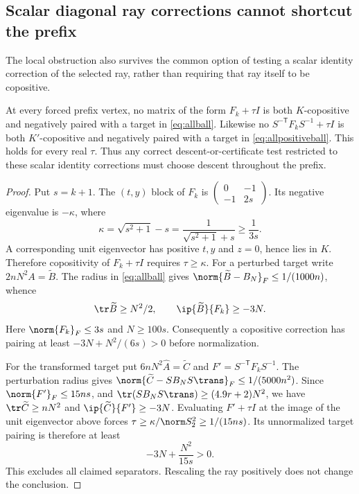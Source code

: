 \subsection{Scalar diagonal ray corrections cannot shortcut the prefix}
The local obstruction also survives the common option of testing a scalar identity correction of the selected ray, rather than requiring that ray itself to be copositive.
\begin{corollary}\label{cor:raycorrection}
At every forced prefix vertex, no matrix of the form $F_k+\tau I$ is both $K$-copositive and negatively paired with a target in \eqref{eq:allball}. Likewise no $S^{-\mathsf T}F_kS^{-1}+\tau I$ is both $K'$-copositive and negatively paired with a target in \eqref{eq:allpositiveball}. This holds for every real $\tau$. Thus any correct descent-or-certificate test restricted to these scalar identity corrections must choose descent throughout the prefix.
\end{corollary}
\begin{proof}
Put $s=k+1$. The $(t,y)$ block of $F_k$ is $\left(\begin{smallmatrix}0&-1\\-1&2s\end{smallmatrix}\right)$. Its negative eigenvalue is $-\kappa$, where
\[
 \kappa=\sqrt{s^2+1}-s=\frac1{\sqrt{s^2+1}+s}\ge\frac1{3s}.
\]
A corresponding unit eigenvector has positive $t,y$ and $z=0$, hence lies in $K$. Therefore copositivity of $F_k+\tau I$ requires $\tau\ge\kappa$. For a perturbed target write $2nN^2A=\widetilde B$. The radius in \eqref{eq:allball} gives $\norm{\widetilde B-B_N}_F\le1/(1000n)$, whence
\[
 \tr\widetilde B\ge N^2/2,\qquad
 \ip{\widetilde B}{F_k}\ge-3N.
\]
Here $\norm{F_k}_F\le3s$ and $N\ge100s$. Consequently a copositive correction has pairing at least $-3N+N^2/(6s)>0$ before normalization.

For the transformed target put $6nN^2\widehat A=\widetilde C$ and $F'=S^{-\mathsf T}F_kS^{-1}$. The perturbation radius gives $\norm{\widetilde C-SB_NS\trans}_F\le1/(5000n^2)$. Since $\norm{F'}_F\le15ns$, and $\tr(SB_NS\trans)\ge(4.9r+2)N^2$, we have $\tr\widetilde C\ge nN^2$ and $\ip{\widetilde C}{F'}\ge-3N$. Evaluating $F'+\tau I$ at the image of the unit eigenvector above forces $\tau\ge\kappa/\norm S_2^2\ge1/(15ns)$. Its unnormalized target pairing is therefore at least
\[
 -3N+\frac{N^2}{15s}>0.
\]
This excludes all claimed separators. Rescaling the ray positively does not change the conclusion.
\end{proof}
